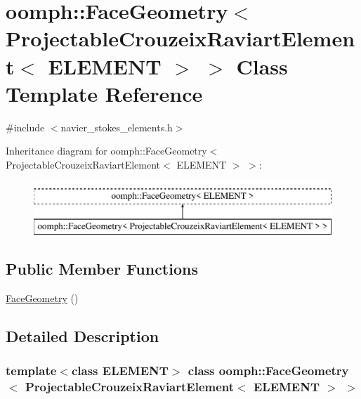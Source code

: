 \hypertarget{classoomph_1_1FaceGeometry_3_01ProjectableCrouzeixRaviartElement_3_01ELEMENT_01_4_01_4}{}\section{oomph\+:\+:Face\+Geometry$<$ Projectable\+Crouzeix\+Raviart\+Element$<$ E\+L\+E\+M\+E\+NT $>$ $>$ Class Template Reference}
\label{classoomph_1_1FaceGeometry_3_01ProjectableCrouzeixRaviartElement_3_01ELEMENT_01_4_01_4}


{\ttfamily \#include $<$navier\+\_\+stokes\+\_\+elements.\+h$>$}

Inheritance diagram for oomph\+:\+:Face\+Geometry$<$ Projectable\+Crouzeix\+Raviart\+Element$<$ E\+L\+E\+M\+E\+NT $>$ $>$\+:\begin{figure}[H]
\begin{center}
\leavevmode
\includegraphics[height=2.000000cm]{classoomph_1_1FaceGeometry_3_01ProjectableCrouzeixRaviartElement_3_01ELEMENT_01_4_01_4}
\end{center}
\end{figure}
\subsection*{Public Member Functions}
\begin{DoxyCompactItemize}
\item 
\hyperlink{classoomph_1_1FaceGeometry_3_01ProjectableCrouzeixRaviartElement_3_01ELEMENT_01_4_01_4_afdd827eb3df6674ad9b01b63d1127ab3}{Face\+Geometry} ()
\end{DoxyCompactItemize}


\subsection{Detailed Description}
\subsubsection*{template$<$class E\+L\+E\+M\+E\+NT$>$\newline
class oomph\+::\+Face\+Geometry$<$ Projectable\+Crouzeix\+Raviart\+Element$<$ E\+L\+E\+M\+E\+N\+T $>$ $>$}

